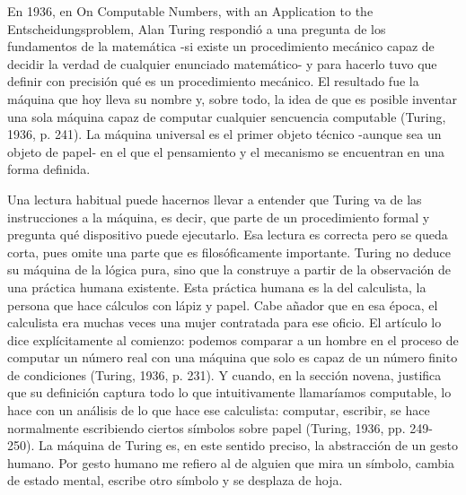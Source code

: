 En 1936, en On Computable Numbers, with an Application to the Entscheidungsproblem, Alan Turing respondió a una pregunta de los fundamentos de la matemática -si existe un procedimiento mecánico capaz de decidir la verdad de cualquier enunciado matemático- y para hacerlo tuvo que definir con precisión qué es un procedimiento mecánico. El resultado fue la máquina que hoy lleva su nombre y, sobre todo, la idea de que es posible inventar una sola máquina capaz de computar cualquier sencuencia computable (Turing, 1936, p. 241). La máquina universal es el primer objeto técnico -aunque sea un objeto de papel- en el que el pensamiento y el mecanismo se encuentran en una forma definida.

Una lectura habitual puede hacernos llevar a entender que Turing va de las instrucciones a la máquina, es decir, que parte de un procedimiento formal y pregunta qué dispositivo puede ejecutarlo. Esa lectura es correcta pero se queda corta, pues omite una parte que es filosóficamente importante. Turing no deduce su máquina de la lógica pura, sino que la construye a partir de la observación de una práctica humana existente. Esta práctica humana es la del calculista, la persona que hace cálculos con lápiz y papel. Cabe añador que en esa época, el calculista era muchas veces una mujer contratada para ese oficio. El artículo lo dice explícitamente al comienzo: podemos comparar a un hombre en el proceso de computar un número real con una máquina que solo es capaz de un número finito de condiciones (Turing, 1936, p. 231). Y cuando, en la sección novena, justifica que su definición captura todo lo que intuitivamente llamaríamos computable, lo hace con un análisis de lo que hace ese calculista: computar, escribir, se hace normalmente escribiendo ciertos símbolos sobre papel (Turing, 1936, pp. 249-250). La máquina de Turing es, en este sentido preciso, la abstracción de un gesto humano. Por gesto humano me refiero al de alguien que mira un símbolo, cambia de estado mental, escribe otro símbolo y se desplaza de hoja.

